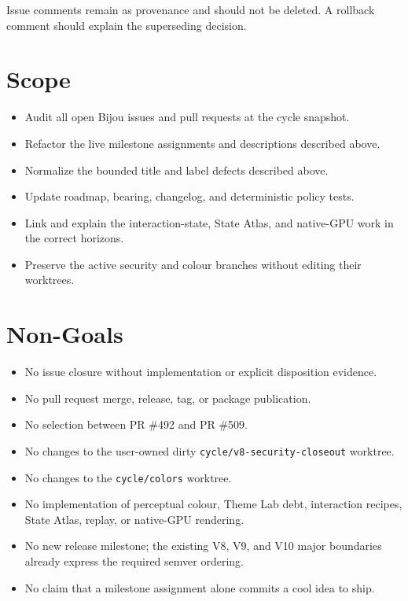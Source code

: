 Issue comments remain as provenance and should not be deleted. A rollback comment should explain the superseding decision.

\section{Scope}\label{record-249-scope}

\begin{itemize}
\tightlist
\item
  Audit all open Bijou issues and pull requests at the cycle snapshot.
\item
  Refactor the live milestone assignments and descriptions described above.
\item
  Normalize the bounded title and label defects described above.
\item
  Update roadmap, bearing, changelog, and deterministic policy tests.
\item
  Link and explain the interaction-state, State Atlas, and native-GPU work in the correct horizons.
\item
  Preserve the active security and colour branches without editing their worktrees.
\end{itemize}

\section{Non-Goals}\label{record-249-non-goals}

\begin{itemize}
\tightlist
\item
  No issue closure without implementation or explicit disposition evidence.
\item
  No pull request merge, release, tag, or package publication.
\item
  No selection between PR \#492 and PR \#509.
\item
  No changes to the user-owned dirty \texttt{c\allowbreak{}y\allowbreak{}c\allowbreak{}l\allowbreak{}e\allowbreak{}/\allowbreak{}v\allowbreak{}8\allowbreak{}-\allowbreak{}s\allowbreak{}e\allowbreak{}c\allowbreak{}u\allowbreak{}r\allowbreak{}i\allowbreak{}t\allowbreak{}y\allowbreak{}-\allowbreak{}c\allowbreak{}l\allowbreak{}o\allowbreak{}s\allowbreak{}e\allowbreak{}o\allowbreak{}u\allowbreak{}t} worktree.
\item
  No changes to the \texttt{c\allowbreak{}y\allowbreak{}c\allowbreak{}l\allowbreak{}e\allowbreak{}/\allowbreak{}c\allowbreak{}o\allowbreak{}l\allowbreak{}o\allowbreak{}r\allowbreak{}s} worktree.
\item
  No implementation of perceptual colour, Theme Lab debt, interaction recipes, State Atlas, replay, or native-GPU rendering.
\item
  No new release milestone; the existing V8, V9, and V10 major boundaries already express the required semver ordering.
\item
  No claim that a milestone assignment alone commits a cool idea to ship.
\end{itemize}

